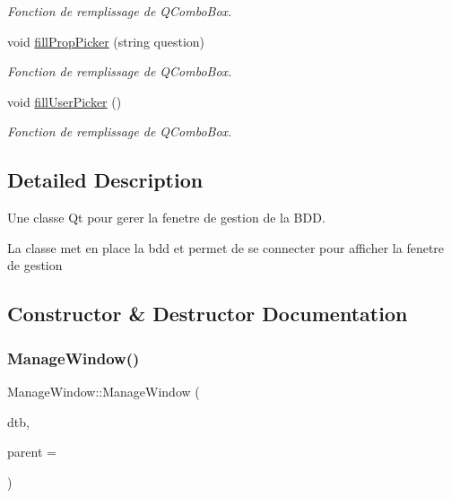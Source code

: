 \begin{DoxyCompactItemize}
\begin{DoxyCompactList}\small\item\em Fonction de remplissage de Q\+Combo\+Box. \end{DoxyCompactList}\item 
void \mbox{\hyperlink{classManageWindow_a08c2bb9ab812720b59794f4eaeb2156b}{fill\+Prop\+Picker}} (string question)
\begin{DoxyCompactList}\small\item\em Fonction de remplissage de Q\+Combo\+Box. \end{DoxyCompactList}\item 
void \mbox{\hyperlink{classManageWindow_a6131d13ca6962964ce8c6a37edbc4006}{fill\+User\+Picker}} ()
\begin{DoxyCompactList}\small\item\em Fonction de remplissage de Q\+Combo\+Box. \end{DoxyCompactList}\end{DoxyCompactItemize}


\subsection{Detailed Description}
Une classe Qt pour gerer la fenetre de gestion de la B\+DD. 

La classe met en place la bdd et permet de se connecter pour afficher la fenetre de gestion 

\subsection{Constructor \& Destructor Documentation}
\mbox{\label{classManageWindow_ab5bd55471f7e1a749810dd28fcc7b9c0}} 
\subsubsection{\texorpdfstring{Manage\+Window()}{ManageWindow()}}
{\footnotesize\ttfamily Manage\+Window\+::\+Manage\+Window (\begin{DoxyParamCaption}\item[{\mbox{\hyperlink{classDatabase}{Database}} $\ast$}]{dtb,  }\item[{Q\+Widget $\ast$}]{parent = {} }\end{DoxyParamCaption})\hspace{0.3cm}{\ttfamily [explicit]}}



